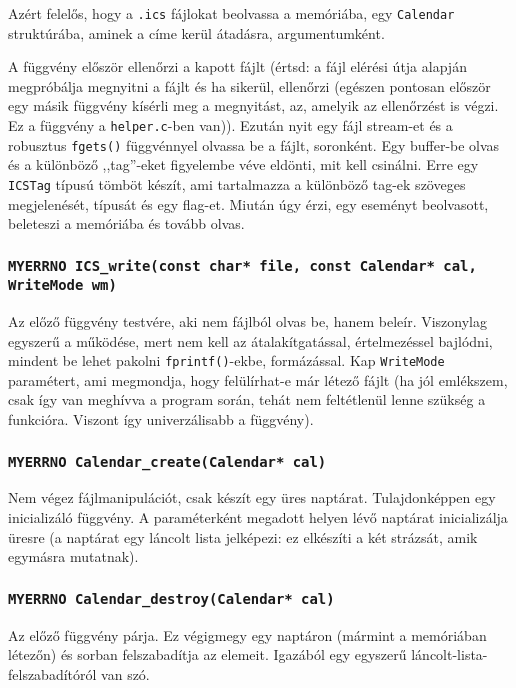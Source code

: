 \documentclass[a4paper]{article}
\begin{document}
Azért felelős, hogy a \texttt{.ics} fájlokat beolvassa a memóriába, egy \texttt{Calendar} struktúrába, aminek a címe kerül átadásra, argumentumként.

A függvény először ellenőrzi a kapott fájlt (értsd: a fájl elérési útja alapján megpróbálja megnyitni a fájlt és ha sikerül, ellenőrzi (egészen pontosan először egy másik függvény kísérli meg a megnyitást, az, amelyik az ellenőrzést is végzi. Ez a függvény a \texttt{helper.c}-ben van)). Ezután nyit egy fájl stream-et és a robusztus \texttt{fgets()} függvénnyel olvassa be a fájlt, soronként. Egy buffer-be olvas és a különböző ,,tag''-eket figyelembe véve eldönti, mit kell csinálni. Erre egy \texttt{ICSTag} típusú tömböt készít, ami tartalmazza a különböző tag-ek szöveges megjelenését, típusát és egy flag-et. Miután úgy érzi, egy eseményt beolvasott, beleteszi a memóriába és tovább olvas.

\subsubsection{\texttt{MYERRNO ICS\_write(const char* file, const Calendar* cal, WriteMode wm)}}

Az előző függvény testvére, aki nem fájlból olvas be, hanem beleír. Viszonylag egyszerű a működése, mert nem kell az átalakítgatással, értelmezéssel bajlódni, mindent be lehet pakolni \texttt{fprintf()}-ekbe, formázással. Kap \texttt{WriteMode} paramétert, ami megmondja, hogy felülírhat-e már létező fájlt (ha jól emlékszem, csak így van meghívva  a program során, tehát nem feltétlenül lenne szükség a funkcióra. Viszont így univerzálisabb a függvény).

\subsubsection{\texttt{MYERRNO Calendar\_create(Calendar* cal)}}

Nem végez fájlmanipulációt, csak készít egy üres naptárat. Tulajdonképpen egy inicializáló függvény. A paraméterként megadott helyen lévő naptárat inicializálja üresre (a naptárat egy láncolt lista jelképezi: ez elkészíti a két strázsát, amik egymásra mutatnak).

\subsubsection{\texttt{MYERRNO Calendar\_destroy(Calendar* cal)}}

Az előző függvény párja. Ez végigmegy egy naptáron (mármint a memóriában létezőn) és sorban felszabadítja az elemeit. Igazából egy egyszerű láncolt-lista-felszabadítóról van szó.
\end{document}
